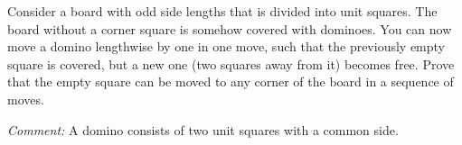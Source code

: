 Consider a board with odd side lengths that is divided into unit squares.
The board without a corner square is somehow covered with dominoes.
You can now move a domino lengthwise by one in one move, such that the previously empty square
is covered, but a new one (two squares away from it) becomes free.
Prove that the empty square can be moved to any corner of the board in a sequence of moves.

\emph{Comment:} A domino consists of two unit squares with a common side.

